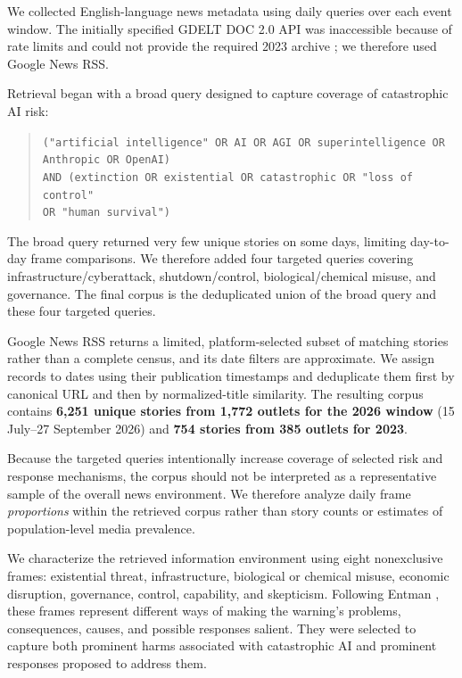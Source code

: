 \elsevierclasstrue\documentclass[preprint,12pt]{elsarticle}%
\begin{document}
We collected English-language news metadata using daily queries over each event window. The initially specified GDELT DOC 2.0 API was inaccessible because of rate limits and could not provide the required 2023 archive \citep{gdelt2026documentation}; we therefore used Google News RSS.

Retrieval began with a broad query designed to capture coverage of catastrophic AI risk: 

\begin{quote}\small\raggedright
\texttt{("artificial intelligence" OR AI OR AGI OR superintelligence OR Anthropic OR OpenAI)}\\
\texttt{AND (extinction OR existential OR catastrophic OR "loss of control"}\\
\texttt{OR "human survival")}
\end{quote}

The broad query returned very few unique stories on some days, limiting day-to-day frame comparisons. We therefore added four targeted queries covering infrastructure/cyberattack, shutdown/control, biological/chemical misuse, and governance. The final corpus is the deduplicated union of the broad query and these four targeted queries.

Google News RSS returns a limited, platform-selected subset of matching stories rather than a complete census, and its date filters are approximate. We assign records to dates using their publication timestamps and deduplicate them first by canonical URL and then by normalized-title similarity. The resulting corpus contains \textbf{6,251 unique stories from 1,772 outlets for the 2026 window} (15 July--27 September 2026) and \textbf{754 stories from 385 outlets for 2023}.

Because the targeted queries intentionally increase coverage of selected risk and response mechanisms, the corpus should not be interpreted as a representative sample of the overall news environment. We therefore analyze daily frame \emph{proportions} within the retrieved corpus rather than story counts or estimates of population-level media prevalence.

We characterize the retrieved information environment using eight nonexclusive frames: existential threat, infrastructure, biological or chemical misuse, economic disruption, governance, control, capability, and skepticism. Following Entman \citep{entman1993framing}, these frames represent different ways of making the warning's problems, consequences, causes, and possible responses salient. They were selected to capture both prominent harms associated with catastrophic AI and prominent responses proposed to address them.
\end{document}

